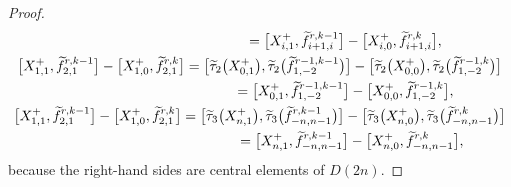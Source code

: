 \documentclass[10pt,a4paper]{amsart}
\numberwithin{equation}{section}
\theoremstyle{definition}
\begin{document}
\begin{proof}
\begin{gather}
\hphantom{\bigl[X^+_{1,1},\widetilde{f}_{2,1}^{r,k-1}\bigr]-\bigl[X^+_{1,0},\widetilde{f}_{2,1}^{r,k}\bigr]}{}
=\bigl[X^+_{i,1},\widetilde{f}_{i+1,i}^{r,k-1}\bigr]-\bigl[X^+_{i,0},\widetilde{f}_{i+1,i}^{r,k}\bigr],\label{eq94}\\
\bigl[X^+_{1,1},\widetilde{f}_{2,1}^{r,k-1}\bigr]-\bigl[X^+_{1,0},\widetilde{f}_{2,1}^{r,k}\bigr]
=\bigl[\widetilde{\tau}_2\bigl(X^+_{0,1}\bigr),\widetilde{\tau}_2\bigl(\widetilde{f}_{1,-2}^{r-1,k-1}\bigr)\bigr]-\bigl[\widetilde{\tau}_2\bigl(X^+_{0,0}\bigr),\widetilde{\tau}_2\bigl(\widetilde{f}_{1,-2}^{r-1,k}\bigr)\bigr]\nonumber\\
\hphantom{\bigl[X^+_{1,1},\widetilde{f}_{2,1}^{r,k-1}\bigr]-\bigl[X^+_{1,0},\widetilde{f}_{2,1}^{r,k}\bigr]}{}
=\bigl[X^+_{0,1},\widetilde{f}_{1,-2}^{r-1,k-1}\bigr]-\bigl[X^+_{0,0},\widetilde{f}_{1,-2}^{r-1,k}\bigr],\nonumber\\%
\bigl[X^+_{1,1},\widetilde{f}_{2,1}^{r,k-1}\bigr]-\bigl[X^+_{1,0},\widetilde{f}_{2,1}^{r,k}\bigr]
=\bigl[\widetilde{\tau}_3\bigl(X^+_{n,1}\bigr),\widetilde{\tau}_3\bigl(\widetilde{f}_{-n,n-1}^{r,k-1}\bigr)\bigr]
-\bigl[\widetilde{\tau}_3\bigl(X^+_{n,0}\bigr),\widetilde{\tau}_3\bigl(\widetilde{f}_{-n,n-1}^{r,k}\bigr)\bigr]\nonumber\\
\hphantom{\bigl[X^+_{1,1},\widetilde{f}_{2,1}^{r,k-1}\bigr)\bigr]-\bigl[X^+_{1,0},\widetilde{f}_{2,1}^{r,k}\bigr)\bigr]}{}
=\bigl[X^+_{n,1},\widetilde{f}_{-n,n-1}^{r,k-1}\bigr]-\bigl[X^+_{n,0},\widetilde{f}_{-n,n-1}^{r,k}\bigr],\nonumber%
\end{gather}
because the right-hand sides are central elements of $D(2n)$.
\end{proof}
\end{document}
